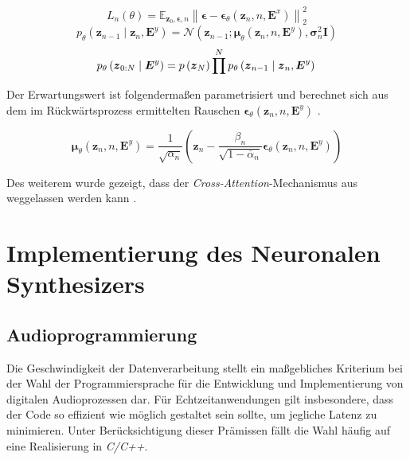 \documentclass[
  a4paper,  %
  twoside,  %
  bibliography=totoc,
  headsepline,
  cleardoublepage=empty,
  parskip=half,
  draft=false
]{scrbook}
\begin{document}
\begin{equation}
    L_n(\theta)=\mathbb{E}_{\boldsymbol{z}_0, \boldsymbol{\epsilon}, n}\left\|\boldsymbol{\epsilon}-\boldsymbol{\epsilon}_\theta\left(\boldsymbol{z}_n, n, \boldsymbol{E}^x\right)\right\|_2^2
\end{equation}
\begin{equation}
    p_\theta\left(\boldsymbol{z}_{n-1} \mid \boldsymbol{z}_n, \boldsymbol{E}^y\right)=\mathcal{N}\left(\boldsymbol{z}_{n-1} ; \boldsymbol{\mu}_\theta\left(\boldsymbol{z}_n, n, \boldsymbol{E}^y\right), \boldsymbol{\sigma}_n^2 \boldsymbol{I}\right)
\end{equation}
\begin{equation}
    p_\theta\left(\boldsymbol{z}_{0: N} \mid \boldsymbol{E}^y\right)=p\left(\boldsymbol{z}_N\right) \prod^N p_\theta\left(\boldsymbol{z}_{n-1} \mid \boldsymbol{z}_n, \boldsymbol{E}^y\right) \\
\end{equation}

Der Erwartungswert ist folgendermaßen parametrisiert und berechnet sich aus dem im Rückwärtsprozess ermittelten Rauschen $\boldsymbol{\epsilon}_\theta\left(\boldsymbol{z}_n, n, \boldsymbol{E}^y\right)$ \cite{liu_audioldm_2023-1}.

\begin{equation}
    \boldsymbol{\mu}_\theta\left(\boldsymbol{z}_n, n, \boldsymbol{E}^y\right)=\frac{1}{\sqrt{\alpha_n}}\left(\boldsymbol{z}_n-\frac{\beta_n}{\sqrt{1-\bar{\alpha}_n}} \boldsymbol{\epsilon}_\theta\left(\boldsymbol{z}_n, n, \boldsymbol{E}^y\right)\right)
\end{equation}

Des weiterem wurde gezeigt, dass der \emph{Cross-Attention}-Mechanismus aus \cite{rombach_high-resolution_2022} weggelassen werden kann \cite{liu_audioldm_2023-1}. 

\section{Implementierung des Neuronalen Synthesizers}
\subsection{Audioprogrammierung}
Die Geschwindigkeit der Datenverarbeitung stellt ein maßgebliches Kriterium bei der Wahl der Programmiersprache für die Entwicklung und Implementierung von digitalen Audioprozessen dar. Für Echtzeitanwendungen gilt insbesondere, dass der Code so effizient wie möglich gestaltet sein sollte, um jegliche Latenz zu minimieren. Unter Berücksichtigung dieser Prämissen fällt die Wahl häufig auf eine Realisierung in \emph{C/C++}. \cite{doumler_c_2015, boulanger_audio_2011}
\end{document}
